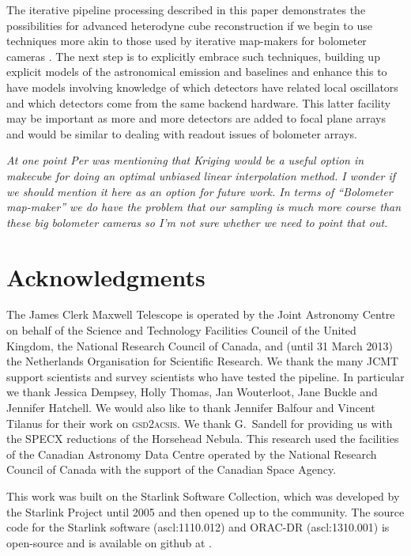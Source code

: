 \documentclass[final,authoryear,5p,times,twocolumn]{elsarticle}
\begin{document}
The iterative pipeline processing described in this paper demonstrates
the possibilities for advanced heterodyne cube reconstruction if we
begin to use techniques more akin to those used by iterative
map-makers for bolometer cameras
\citep[e.g.][]{2013MNRAS.430.2545C}. The next step is to explicitly
embrace such techniques, building up explicit models of the
astronomical emission and baselines and enhance this to have models
involving knowledge of which detectors have related local oscillators
and which detectors come from the same backend hardware. This latter
facility may be important as more and more detectors are added to
focal plane arrays and would be similar to dealing with readout issues
of bolometer arrays.

\textit{At one point Per was mentioning that Kriging would be a useful
  option in makecube for doing an optimal unbiased linear
  interpolation method. I wonder if we should mention it here as an
  option for future work. In terms of ``Bolometer map-maker'' we do
  have the problem that our sampling is much more course than these
  big bolometer cameras so I'm not sure whether we need to point that
  out.}

\section{Acknowledgments}

The James Clerk Maxwell Telescope is operated by the Joint Astronomy
Centre on behalf of the Science and Technology Facilities Council of
the United Kingdom, the National Research Council of Canada, and
(until 31 March 2013) the Netherlands Organisation for Scientific
Research. We thank the many JCMT support scientists and survey
scientists who have tested the pipeline. In particular we thank
Jessica Dempsey, Holly Thomas, Jan Wouterloot, Jane Buckle and
Jennifer Hatchell. We would also like to thank Jennifer Balfour and
Vincent Tilanus for their work on \textsc{gsd2acsis}. We thank
G.~Sandell for providing us with the SPECX reductions of the Horsehead
Nebula. This research used the facilities of the Canadian Astronomy
Data Centre operated by the National Research Council of Canada with
the support of the Canadian Space Agency.

This work was built on the Starlink Software Collection, which was
developed by the Starlink Project until 2005
\citep{1982QJRAS..23..485D,2005ASPC..347...22D,2008ASPC..394..650C}
and then opened up to the community. The source code for the Starlink
software (ascl:1110.012) and ORAC-DR (ascl:1310.001) is open-source and is
available on github at
.
\end{document}
